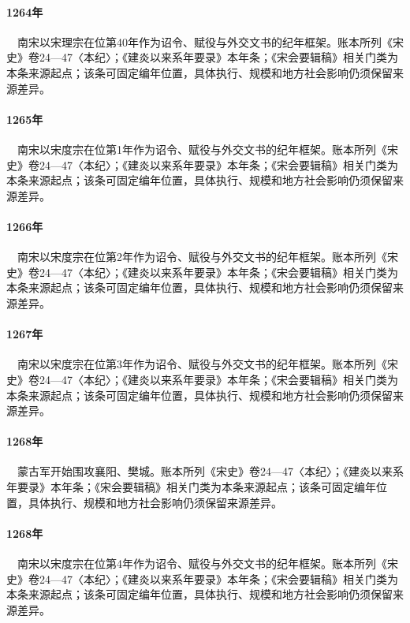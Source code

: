 \paragraph{1264年}　南宋以宋理宗在位第40年作为诏令、赋役与外交文书的纪年框架。账本所列《宋史》卷24—47〈本纪〉；《建炎以来系年要录》本年条；《宋会要辑稿》相关门类为本条来源起点；该条可固定编年位置，具体执行、规模和地方社会影响仍须保留来源差异。

\paragraph{1265年}　南宋以宋度宗在位第1年作为诏令、赋役与外交文书的纪年框架。账本所列《宋史》卷24—47〈本纪〉；《建炎以来系年要录》本年条；《宋会要辑稿》相关门类为本条来源起点；该条可固定编年位置，具体执行、规模和地方社会影响仍须保留来源差异。

\paragraph{1266年}　南宋以宋度宗在位第2年作为诏令、赋役与外交文书的纪年框架。账本所列《宋史》卷24—47〈本纪〉；《建炎以来系年要录》本年条；《宋会要辑稿》相关门类为本条来源起点；该条可固定编年位置，具体执行、规模和地方社会影响仍须保留来源差异。

\paragraph{1267年}　南宋以宋度宗在位第3年作为诏令、赋役与外交文书的纪年框架。账本所列《宋史》卷24—47〈本纪〉；《建炎以来系年要录》本年条；《宋会要辑稿》相关门类为本条来源起点；该条可固定编年位置，具体执行、规模和地方社会影响仍须保留来源差异。

\paragraph{1268年}　蒙古军开始围攻襄阳、樊城。账本所列《宋史》卷24—47〈本纪〉；《建炎以来系年要录》本年条；《宋会要辑稿》相关门类为本条来源起点；该条可固定编年位置，具体执行、规模和地方社会影响仍须保留来源差异。

\paragraph{1268年}　南宋以宋度宗在位第4年作为诏令、赋役与外交文书的纪年框架。账本所列《宋史》卷24—47〈本纪〉；《建炎以来系年要录》本年条；《宋会要辑稿》相关门类为本条来源起点；该条可固定编年位置，具体执行、规模和地方社会影响仍须保留来源差异。

